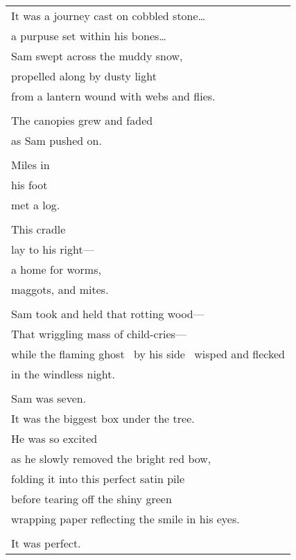 \documentclass{article}
\begin{document}
\begin{center}
\begin{tabular}{l}
It was a journey cast on cobbled stone\ldots \\
a purpuse set within his bones\ldots \\
Sam swept across the muddy snow, \\
propelled along by dusty light \\
from a lantern wound with webs and flies. \\
\\
The canopies grew and faded \\
as Sam pushed on. \\
\\
Miles in \\
his foot \\
met a log. \\
\\
This cradle \\
lay to his right--- \\
a home for worms, \\
maggots, and mites. \\
\\
Sam took and held that rotting wood--- \\
That wriggling mass of child-cries--- \\
while the flaming ghost \
by his side \
wisped and flecked \\
in the windless night. \\
\\
\hspace*{2ex}Sam was seven. \\
\hspace*{2ex}It was the biggest box under the tree. \\
\hspace*{2ex}He was so excited \\
\hspace*{2ex}as he slowly removed the bright red bow, \\
\hspace*{2ex}folding it into this perfect satin pile \\
\hspace*{2ex}before tearing off the shiny green \\
\hspace*{2ex}wrapping paper reflecting the smile in his eyes. \\
\\
\hspace*{2ex}It was perfect. \\

\end{tabular}
\end{center}
\end{document}
